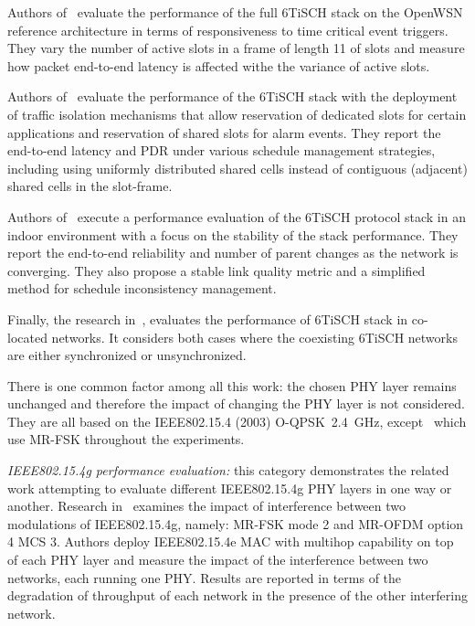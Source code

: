 \documentclass[journal,article,submit,moreauthors,pdftex]{Definitions/mdpi}
\newcommand{\oqpsk}        {O-QPSK~2.4~GHz}
\begin{document}
Authors of~\cite{yang18analysis} evaluate the performance of the full 6TiSCH stack on the OpenWSN reference architecture in terms of responsiveness to time critical event triggers.
They vary the number of active slots in a frame of length 11 of slots and measure how packet end-to-end latency is affected withe the variance of active slots. 

Authors of~\cite{theoleyre16experimental} evaluate the performance of the 6TiSCH stack with the deployment of traffic isolation mechanisms that allow reservation of dedicated slots for certain applications and reservation of shared slots for alarm events.
They report the end-to-end latency and PDR under various schedule management strategies, including using uniformly distributed shared cells instead of contiguous (adjacent) shared cells in the slot-frame.

Authors of~\cite{teleshermeto18reactions} execute a performance evaluation of the 6TiSCH protocol stack in an indoor environment with a focus on the stability of the stack performance.
They report the end-to-end reliability and number of parent changes as the network is converging.
They also propose a stable link quality metric and a simplified method for schedule inconsistency management. 

Finally, the research in~\cite{benyaala16performance}, evaluates the performance of 6TiSCH stack in co-located networks.
It considers both cases where the coexisting 6TiSCH networks are either  synchronized or unsynchronized.

There is one common factor among all this work: the chosen PHY layer remains unchanged and therefore the impact of changing the PHY layer is not considered. 
They are all based on the IEEE802.15.4 (2003) \oqpsk , except~\cite{sum17experimental} which use MR-FSK throughout the experiments. 


\textit{IEEE802.15.4g performance evaluation:} this category  demonstrates the related  work attempting to evaluate different IEEE802.15.4g PHY layers in one way or another.
Research in~\cite{kojima15system} examines the impact of interference between two modulations of IEEE802.15.4g, namely: MR-FSK mode 2 and MR-OFDM option 4 MCS 3. 
Authors deploy IEEE802.15.4e MAC with multihop capability on top of each PHY layer and measure the impact of the interference between two networks, each running one PHY.
Results are reported in terms of the degradation of throughput of each network in the presence of the other interfering network.
\end{document}
